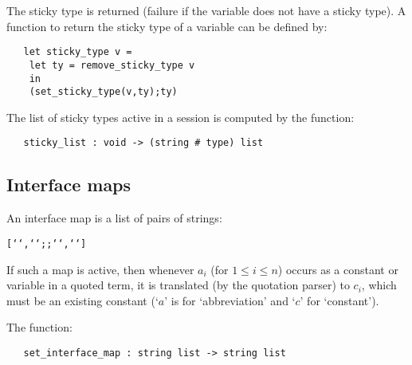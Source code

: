 \noindent The sticky type is returned (failure if the variable does not
have a sticky type). A function to return the sticky type of a variable
can be defined by:

\begin{hol}\begin{verbatim}
   let sticky_type v =
    let ty = remove_sticky_type v
    in
    (set_sticky_type(v,ty);ty)
\end{verbatim}\end{hol}

\noindent The list of sticky types active in a session is computed by the
function:

\begin{boxed}
\begin{verbatim}
   sticky_list : void -> (string # type) list
\end{verbatim}\end{boxed}

\subsection{Interface maps}

An interface map is a list of pairs of strings:

\begin{hol}\begin{alltt}
   [``,``; \m{\ldots} ;``,``]
\end{alltt}\end{hol}


If such a map is active, then whenever $a_i$ (for $1\leq i \leq n$) occurs as a
constant or  variable  in  a quoted  term, it  is translated  (by the quotation
parser) to  $c_i$,  which  must  be  an  existing constant  (`$a$' is for
`abbreviation' and `$c$' for `constant').

The function:

\begin{boxed}
\begin{verbatim}
   set_interface_map : string list -> string list
\end{verbatim}\end{boxed}

